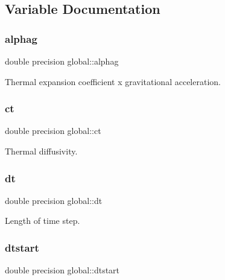 \subsection{Variable Documentation}
\mbox{\label{namespaceglobal_abe54a711bf9d8c30a6debfb651bdf47d}} 
\subsubsection{\texorpdfstring{alphag}{alphag}}
{\footnotesize\ttfamily double precision global\+::alphag}



Thermal expansion coefficient x gravitational acceleration. 

\mbox{\label{namespaceglobal_acf5521de662915885b6a73718cd6314b}} 
\subsubsection{\texorpdfstring{ct}{ct}}
{\footnotesize\ttfamily double precision global\+::ct}



Thermal diffusivity. 

\mbox{\label{namespaceglobal_a24d27ecfb0e7d422997122c9345bac8b}} 
\subsubsection{\texorpdfstring{dt}{dt}}
{\footnotesize\ttfamily double precision global\+::dt}



Length of time step. 

\mbox{\label{namespaceglobal_a3c8fbc22da61f7188e79bad2b9ba1d16}} 
\subsubsection{\texorpdfstring{dtstart}{dtstart}}
{\footnotesize\ttfamily double precision global\+::dtstart}



